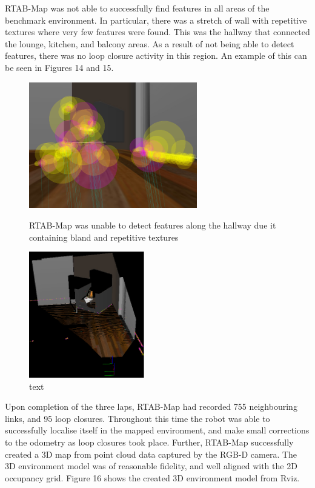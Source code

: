 \documentclass[a4paper]{article}
\begin{document}
RTAB-Map was not able to successfully find features in all areas of the benchmark environment. In particular, there was a stretch of wall with repetitive textures where very few features were found. This was the hallway that connected the lounge, kitchen, and balcony areas. As a result of not being able to detect features, there was no loop closure activity in this region. An example of this can be seen in Figures 14 and 15. 
\begin{figure}[h]
\centering
\begin{minipage}[t]{0.45\textwidth}
\centering
\includegraphics[height=5.5cm]{kitchen_features}
\caption{RTAB-Map was unable to detect features along the hallway due it containing bland and repetitive textures}
\end{minipage}
\hspace{1cm}
\begin{minipage}[t]{0.45\textwidth}
\centering
\includegraphics[height=5.5cm]{kitchen_constraints}
\caption{text}
\end{minipage}
\end{figure}

Upon completion of the three laps, RTAB-Map had recorded 755 neighbouring links, and 95 loop closures. Throughout this time the robot was able to successfully localise itself in the mapped environment, and make small corrections to the odometry as loop closures took place. Further, RTAB-Map successfully created a 3D map from point cloud data captured by the RGB-D camera. The 3D environment model was of reasonable fidelity, and well aligned with the 2D occupancy grid. Figure 16 shows the created 3D environment model from Rviz.
\end{document}
